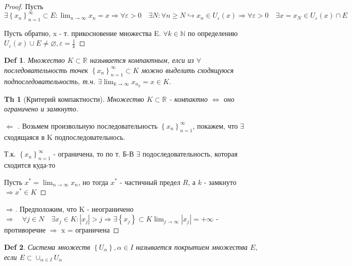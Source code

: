 \documentclass[a5paper, 10pt]{article}
\theoremstyle{plain}
\newtheorem*{theorem}{Th}
\newtheorem{definition}{Def}
\newcommand{\N}{\mathbb N}
\newcommand{\R}{\mathbb R}
\newcommand{\eps}{\varepsilon}
\newcommand{\hrarrow}{\hookrightarrow}
\newcommand{\Larrow}{\Leftarrow}
\newcommand{\Rarrow}{\Rightarrow}
\newcommand{\Lrarrow}{\Leftrightarrow}
\begin{document}
    \begin{proof}
        Пусть $ \exists \left\{x_n \right\}_{n = 1}^{\infty} \subset E:
        \lim_{n \to \infty} x_n = x \Rarrow  \forall \eps > 0 \quad \exists
        N: \forall n \geq N \hrarrow x_n \in U_{\eps}(x) \Rarrow
        \forall \eps > 0 \quad \exists x = x_N \in U_{\eps}(x) \cap E $

        Пусть обратно, x - т. прикосновение множества E.
        $ \forall k \in \N $ по определению $ U_{\eps}(x) \cup E \neq \varnothing,
        \eps = \frac{1}{k} $
    \end{proof}

    \begin{definition}
        Множество $ K \subset \R $ называется компактным, елси из $ \forall $ последовательность
        точек $ \left\{x_n \right\}_{n = 1}^{\infty} \subset K $ можно выделить сходящуюся
        подпоследовательность, т.ч. $ \exists \lim_{k \to \infty} x_{n_k} = x \in K $.
    \end{definition}

    \begin{theorem}[Критерий компактности]
        Множество $ K \subset \R $ - компактно $ \Lrarrow $ оно ограничено и замкнуто.
    \end{theorem}

    \begin{proof}[ $ \Larrow $ ]
        Возьмем произвольную последовательность $ \left\{x_n \right\}_{n = 1}^{\infty} $,
        покажем, что $ \exists  $ сходящаяся в K подпоследовательнось.

        Т.к. $ \left\{x_n \right\}_{n = 1}^{\infty} $ - ограничена, то по т. Б-В
        $ \exists $ подоследовательность, которая сходится куда-то

        Пусть $ x^* = \lim_{n \to \infty} x_n $, но тогда $ x^* $
        - частичный предел $ R $, а
        $ k $ - замкнуто $ \Rarrow x^* \in K $
    \end{proof}

    \begin{proof}[ $ \Rarrow $]
        Предположим, что K - неограничено $ \Rarrow   \quad \forall j \in N \quad
        \exists x_j \in K: |x_j| > j \Rarrow \exists \left\{ x_j \right\} \subset K
        \lim_{j \to \infty} \left| x_j \right| = +\infty $ - противоречие
        $ \Rarrow  $ x = ограничена
    \end{proof}

    \begin{definition}
        Система множеств $ \left\{ U_\alpha \right\}, \alpha \in I $ называется
        покрытием множества $ E $, если $ E \subset \cup_{\alpha \in I} U_{\alpha} $
    \end{definition}
\end{document}
